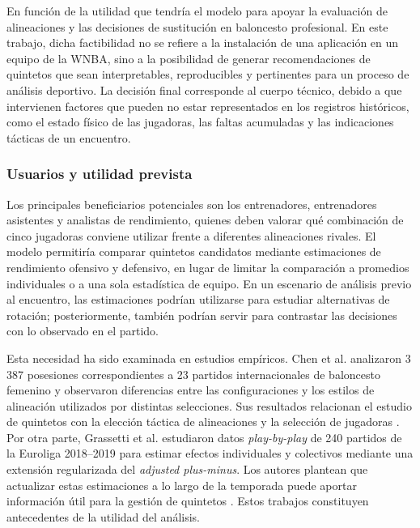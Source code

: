 En función de la utilidad que tendría el modelo para apoyar la evaluación de alineaciones y las decisiones de sustitución en baloncesto profesional. En este trabajo, dicha factibilidad no se refiere a la instalación de una aplicación en un equipo de la WNBA, sino a la posibilidad de generar recomendaciones de quintetos que sean interpretables, reproducibles y pertinentes para un proceso de análisis deportivo. La decisión final corresponde al cuerpo técnico, debido a que intervienen factores que pueden no estar representados en los registros históricos, como el estado físico de las jugadoras, las faltas acumuladas y las indicaciones tácticas de un encuentro.

\subsubsection*{Usuarios y utilidad prevista}

Los principales beneficiarios potenciales son los entrenadores, entrenadores asistentes y analistas de rendimiento, quienes deben valorar qué combinación de cinco jugadoras conviene utilizar frente a diferentes alineaciones rivales. El modelo permitiría comparar quintetos candidatos mediante estimaciones de rendimiento ofensivo y defensivo, en lugar de limitar la comparación a promedios individuales o a una sola estadística de equipo. En un escenario de análisis previo al encuentro, las estimaciones podrían utilizarse para estudiar alternativas de rotación; posteriormente, también podrían servir para contrastar las decisiones con lo observado en el partido.

Esta necesidad ha sido examinada en estudios empíricos. Chen et al. analizaron 3\,387 posesiones correspondientes a 23 partidos internacionales de baloncesto femenino y observaron diferencias entre las configuraciones y los estilos de alineación utilizados por distintas selecciones. Sus resultados relacionan el estudio de quintetos con la elección táctica de alineaciones y la selección de jugadoras \cite{Chen17122023}. Por otra parte, Grassetti et al. estudiaron datos \textit{play-by-play} de 240 partidos de la Euroliga 2018--2019 para estimar efectos individuales y colectivos mediante una extensión regularizada del \textit{adjusted plus-minus}. Los autores plantean que actualizar estas estimaciones a lo largo de la temporada puede aportar información útil para la gestión de quintetos \cite{grassetti2021lineupmanagement}. Estos trabajos constituyen antecedentes de la utilidad del análisis.


